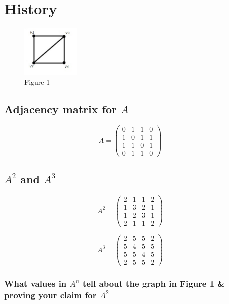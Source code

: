 \documentclass[12pt]{scrreprt}
\begin{document}
\tableofcontents 

\chapter{History}
\begin{figure}[h]
	
	\centering
		\includegraphics[width=0.25\textwidth]{figure1}
	\caption{Figure 1}

\end{figure}

\section{Adjacency matrix for $A$} 

\[ A = \left( \begin{array}{cccc}
0 & 1 & 1 & 0 \\
1 & 0 & 1 & 1 \\
1 & 1 & 0 & 1 \\
0 & 1 & 1 & 0 \end{array} \right)\] 

\section{$A^2$ and $A^3$}

\[ A^2 = \left( \begin{array}{cccc}
2 & 1 & 1 & 2 \\
1 & 3 & 2 & 1 \\
1 & 2 & 3 & 1 \\
2 & 1 & 1 & 2 \end{array} \right)\] 

\[ A^3 = \left( \begin{array}{cccc}
2 & 5 & 5 & 2 \\
5 & 4 & 5 & 5 \\
5 & 5 & 4 & 5 \\
2 & 5 & 5 & 2 \end{array} \right)\] 

\pagebreak

\subsection{What values in $A^n$ tell about the graph in Figure 1 & proving your claim for $A^2$} 
\end{document}
